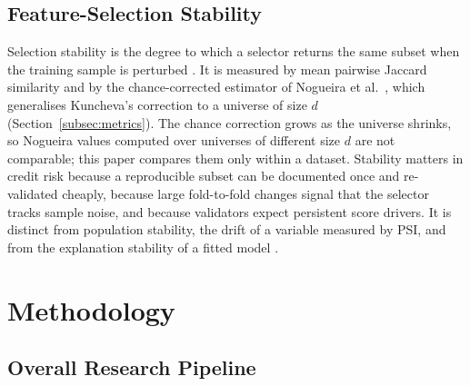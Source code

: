 \documentclass[final,5p,twocolumn]{elsarticle}
\begin{document}
\subsection{Feature-Selection Stability}
\label{subsec:fs_stability_background}

Selection stability is the degree to which a selector returns the same subset when the training sample is perturbed \cite{kalousis2007}. It is measured by mean pairwise Jaccard similarity \cite{jaccard1901} and by the chance-corrected estimator of Nogueira et al.\ \cite{nogueira2018}, which generalises Kuncheva's correction \cite{kuncheva2007} to a universe of size $d$ (Section~\ref{subsec:metrics}). The chance correction grows as the universe shrinks, so Nogueira values computed over universes of different size $d$ are not comparable; this paper compares them only within a dataset. Stability matters in credit risk because a reproducible subset can be documented once and re-validated cheaply, because large fold-to-fold changes signal that the selector tracks sample noise, and because validators expect persistent score drivers. It is distinct from population stability, the drift of a variable measured by PSI, and from the explanation stability of a fitted model \cite{ballegeer2025}.


\section{Methodology}
\label{sec:methodology}

\subsection{Overall Research Pipeline}
\label{subsec:pipeline}
\end{document}
